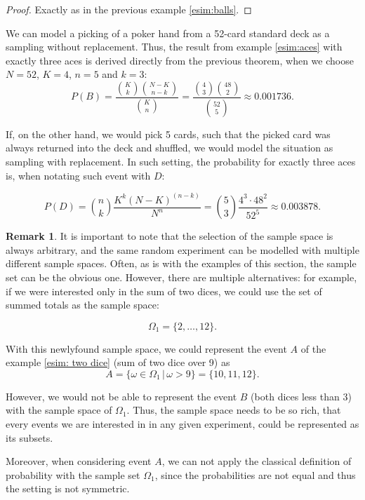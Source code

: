 \documentclass[12pt,a4paper,leqno]{report}
\theoremstyle{plain}
\theoremstyle{definition}
\newtheorem{remark}[equation]{Remark}
\begin{document}
\begin{proof}
Exactly as in the previous example \ref{esim:balls}.
\end{proof}

We can model a picking of a poker hand from a 52-card standard deck as a sampling without replacement. Thus, the result from example \ref{esim:aces} with exactly three aces is derived directly from the previous theorem, when we choose $N=52$, $K=4$, $n=5$ and $k=3$:
\[
P(B) = \frac{\binom{K}{k}\binom{N-K}{n-k}}{\binom{K}{n}} = \frac{\binom{4}{3}\binom{48}{2}}{\binom{52}{5}} \approx 0.001736.
\]

If, on the other hand, we would pick 5 cards, such that the picked card was always returned into the deck and shuffled, we would model the situation as sampling with replacement. In such setting, the probability for exactly three aces is, when notating such event with $D$:

\[
P(D) = \binom{n}{k} \frac{K^k(N-K)^{(n-k)}}{N^n} = \binom{5}{3} \frac{4^3 \cdot 48^{2}}{52^5} \approx 0.003878.
\]

\bigskip

\begin{remark}
It is important to note that the selection of the sample space is always arbitrary, and the same random experiment can be modelled with multiple different sample spaces. Often, as is with the examples of this section, the sample set can be the obvious one. However, there are multiple alternatives: for example, if we were interested only in the sum of two dices, we could use the set of summed totals as the sample space: 

\[
\Omega_1 = \{2, \dots , 12\}.
\]

With this newlyfound sample space, we could represent the event $A$ of the example \ref{esim: two dice} (sum of two dice over 9) as 
\[
A = \{\omega \in \Omega_1 \,|\,  \omega > 9\} = \{10,11,12\}.
\]

However, we would not be able to represent the event $B$ (both dices less than 3) with the sample space of $\Omega_1$. Thus, the sample space needs to be so rich, that every events we are interested in in any given experiment, could be represented as its subsets.

Moreover, when considering event $A$, we can not apply the classical definition of probability with the sample set $\Omega_1$, since the probabilities are not equal and thus the setting is not symmetric.\end{remark}
\end{document}
